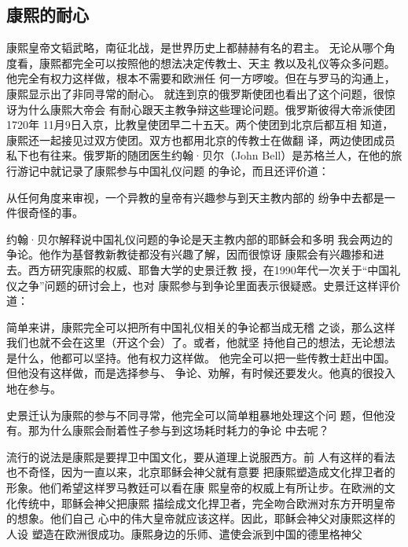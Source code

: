\subsection{康熙的耐心}
\par
康熙皇帝文韬武略，南征北战，是世界历史上都赫赫有名的君主。%
无论从哪个角度看，康熙都完全可以按照他的想法决定传教士、天主%
教以及礼仪等众多问题。他完全有权力这样做，根本不需要和欧洲任%
何一方啰唆。但在与罗马的沟通上，康熙显示出了非同寻常的耐心。%
就连到京的俄罗斯使团也看出了这个问题，很惊讶为什么康熙大帝会%
有耐心跟天主教争辩这些理论问题。俄罗斯彼得大帝派使团1720年%
11月9日入京，比教皇使团早二十五天。两个使团到北京后都互相%
知道，康熙还一起接见过双方使团。双方也都用北京的传教士在做翻%
译，两边使团成员私下也有往来。俄罗斯的随团医生约翰·贝尔（John%
\space%
Bell）是苏格兰人，在他的旅行游记中就记录了康熙参与中国礼仪问题%
的争论，而且还评价道：%
\par
{\bookkai 从任何角度来审视，一个异教的皇帝有兴趣参与到天主教内部的}%
{\bookkai 纷争中去都是一件很奇怪的事。}%
\par
约翰·贝尔解释说中国礼仪问题的争论是天主教内部的耶稣会和多明%
我会两边的争论。他作为基督教新教徒都没有兴趣了解，因而很惊讶%
康熙会有兴趣掺和进去。西方研究康熙的权威、耶鲁大学的史景迁教%
授，在1990年代一次关于“中国礼仪之争”问题的研讨会上，也对%
康熙参与到争论里面表示很疑惑。史景迁这样评价道：%
\par
{\bookkai 简单来讲，康熙完全可以把所有中国礼仪相关的争论都当成无稽}%
{\bookkai 之谈，那么这样我们也就不会在这里（开这个会）了。或者，他就坚}%
{\bookkai 持他自己的想法，无论想法是什么，他都可以坚持。他有权力这样做。}%
{\bookkai 他完全可以把一些传教士赶出中国。但他没有这样做，而是选择参与、}%
{\bookkai 争论、劝解，有时候还要发火。他真的很投入地在参与。}%
\par
史景迁认为康熙的参与不同寻常，他完全可以简单粗暴地处理这个问%
题，但他没有。那为什么康熙会耐着性子参与到这场耗时耗力的争论%
中去呢？%
\par
流行的说法是康熙是要捍卫中国文化，要从道理上说服西方。前%
人有这样的看法也不奇怪，因为一直以来，北京耶稣会神父就有意要%
把康熙塑造成文化捍卫者的形象。他们希望这样罗马教廷可以看在康%
熙皇帝的权威上有所让步。在欧洲的文化传统中，耶稣会神父把康熙%
描绘成文化捍卫者，完全吻合欧洲对东方开明皇帝的想象。他们自己%
心中的伟大皇帝就应该这样。因此，耶稣会神父对康熙这样的人设%
塑造在欧洲很成功。康熙身边的乐师、遣使会派到中国的德里格神父%
